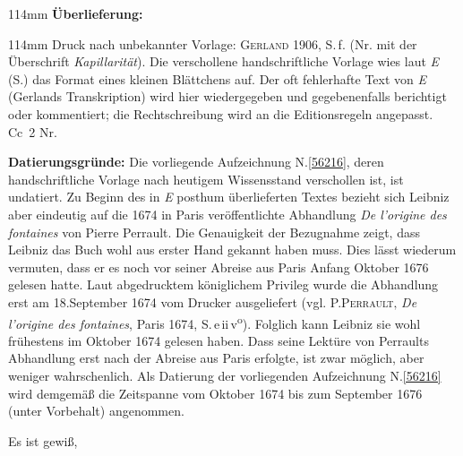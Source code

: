 %
\frenchspacing%
\begin{ledgroupsized}[r]{114mm}%
\footnotesize%
\pstart%
\noindent%
\textbf{Überlieferung:}%
\pend%
\end{ledgroupsized}%
\begin{ledgroupsized}[r]{114mm}%
\footnotesize%
\pstart%
\parindent -6mm%
%
Druck nach unbekannter Vorlage:
\textsc{Gerland} 1906, S.\,f.
(Nr. mit der Überschrift \textit{Kapillarität}).%
\cite{00197}
Die verschollene handschriftliche Vorlage wies laut \textit{E} (S.) das Format eines kleinen Blättchens auf.
Der oft fehlerhafte Text von \textit{E} (Gerlands Transkription) wird hier wiedergegeben und gegebenenfalls berichtigt oder kommentiert;
die Rechtschreibung wird an die Editionsregeln angepasst.
\newline%
Cc~2 Nr.
\pend%
\end{ledgroupsized}%
\vspace{5mm}%
\begin{ledgroup}%
\footnotesize%
\pstart%
\noindent%
\textbf{Datierungsgründe:}
%
Die vorliegende Aufzeichnung N.\;\ref{56216}, deren handschriftliche Vorlage nach heutigem Wissensstand verschollen ist, ist undatiert.
Zu Beginn des in \textit{E} posthum überlieferten Textes bezieht sich Leibniz aber eindeutig auf die 1674 in Paris veröffentlichte Abhandlung \textit{De l'origine des fontaines}\cite{02534} von Pierre Perrault.
Die Genauigkeit der Bezugnahme zeigt, dass Leibniz das Buch wohl aus erster Hand gekannt haben muss.
Dies lässt wiederum vermuten, dass er es noch vor seiner Abreise aus Paris Anfang Oktober 1676 gelesen hatte.
Laut abgedrucktem königlichem Privileg wurde die Abhandlung erst am 18.\;September 1674 vom Drucker ausgeliefert (vgl. \textsc{P.\;Perrault}‚ \textit{De l'origine des fontaines}, Paris 1674, S.\,e\,ii\,v\textsuperscript{o}).\cite{02534}
Folglich kann Leibniz sie wohl frühestens im Oktober 1674 gelesen haben.
Dass seine Lektüre von Perraults Abhandlung erst nach der Abreise aus Paris erfolgte, ist zwar möglich, aber weniger wahrschenlich.
Als Datierung der vorliegenden Aufzeichnung N.\;\ref{56216} wird demgemäß die Zeitspanne vom Oktober 1674 bis zum September 1676 (unter Vorbehalt) angenommen.
\pend%
\end{ledgroup}%
%
\frenchspacing%
\vspace{8mm}%
\normalsize%
\pstart%
\noindent%
Es ist gewiß,
